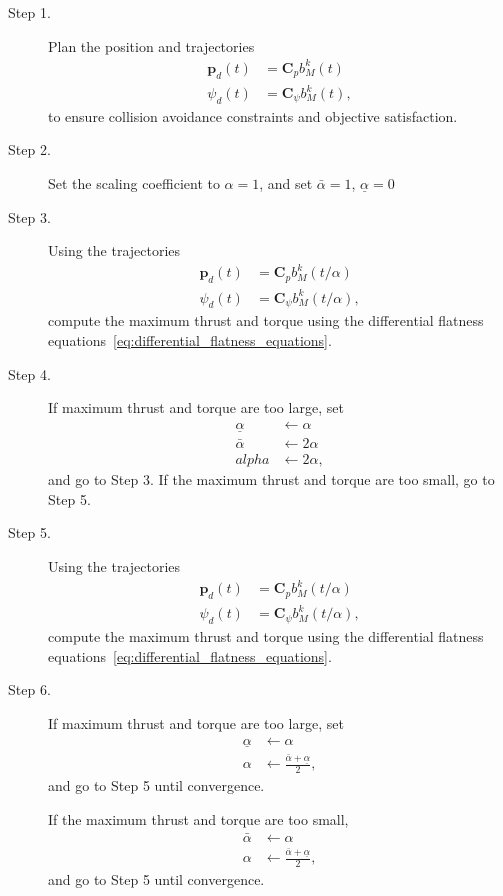 \begin{description}
	\item[Step 1.]  Plan the position and trajectories
		\begin{align*}
			\mathbf{p}_d(t) &= \mathbf{C}_p b_M^k(t) \\	
			\psi_d(t) &= \mathbf{C}_{\psi} b_M^k(t),
		\end{align*}	
		to ensure collision avoidance constraints and objective satisfaction.
	\item[Step 2.]  Set the scaling coefficient to $\alpha = 1$, and set $\bar{\alpha}=1$, $\underline{\alpha}=0$
	\item[Step 3.]  Using the trajectories 
		\begin{align*}
			\mathbf{p}_d(t) &= \mathbf{C}_p b_M^k(t/\alpha) \\	
			\psi_d(t) &= \mathbf{C}_{\psi} b_M^k(t/\alpha),
		\end{align*}	
		compute the maximum thrust and torque using the differential flatness equations~\eqref{eq:differential_flatness_equations}.
	\item[Step 4.]  If maximum thrust and torque are too large, set 
		\begin{align*}
			\underline{\alpha} &\leftarrow \alpha \\
			\bar{\alpha} &\leftarrow 2\alpha \\
			alpha &\leftarrow 2\alpha,
		\end{align*}
 		and go to Step 3.
		If the maximum thrust and torque are too small, go to Step 5.
	\item[Step 5.] Using the trajectories 
		\begin{align*}
			\mathbf{p}_d(t) &= \mathbf{C}_p b_M^k(t/\alpha) \\	
			\psi_d(t) &= \mathbf{C}_{\psi} b_M^k(t/\alpha),
		\end{align*}	
		compute the maximum thrust and torque using the differential flatness equations~\eqref{eq:differential_flatness_equations}.
	\item[Step 6.] If maximum thrust and torque are too large, set
		\begin{align*}
			\underline{\alpha} &\leftarrow \alpha \\
			\alpha &\leftarrow \frac{\bar{\alpha}+\underline{\alpha}}{2},
		\end{align*}
		and go to Step 5 until convergence.
		
		If the maximum thrust and torque are too small, 
		\begin{align*}
			\bar{\alpha} &\leftarrow \alpha \\
			\alpha &\leftarrow \frac{\bar{\alpha}+\underline{\alpha}}{2},
		\end{align*}
		and go to Step 5 until convergence.
\end{description}


